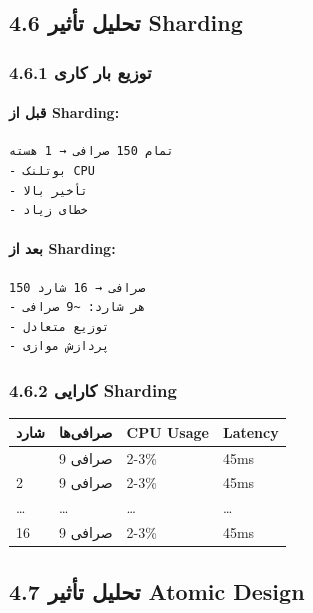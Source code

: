 \documentclass[
]{article}
\newcounter{none} %
\begin{document}
\subsection{4.6 تحلیل تأثیر
Sharding}\label{ux62aux62dux644ux6ccux644-ux62aux623ux62bux6ccux631-sharding}

\subsubsection{4.6.1 توزیع بار
کاری}\label{ux62aux648ux632ux6ccux639-ux628ux627ux631-ux6a9ux627ux631ux6cc}

\paragraph{قبل از Sharding:}\label{ux642ux628ux644-ux627ux632-sharding}

\begin{verbatim}
تمام 150 صرافی → 1 هسته
- بوتلنک CPU
- تأخیر بالا
- خطای زیاد
\end{verbatim}

\paragraph{بعد از Sharding:}\label{ux628ux639ux62f-ux627ux632-sharding}

\begin{verbatim}
150 صرافی → 16 شارد
- هر شارد: ~9 صرافی
- توزیع متعادل
- پردازش موازی
\end{verbatim}

\subsubsection{4.6.2 کارایی
Sharding}\label{ux6a9ux627ux631ux627ux6ccux6cc-sharding}

{\def\LTcaptype{none} %
\begin{longtable}[]{@{}llll@{}}
\toprule\noalign{}
شارد & صرافی‌ها & CPU Usage & Latency \\
\midrule\noalign{}
\endhead
\bottomrule\noalign{}
\endlastfoot
1 & 9 صرافی & 2-3\% & 45ms \\
2 & 9 صرافی & 2-3\% & 45ms \\
\ldots{} & \ldots{} & \ldots{} & \ldots{} \\
16 & 9 صرافی & 2-3\% & 45ms \\
\end{longtable}
}

\subsection{4.7 تحلیل تأثیر Atomic
Design}\label{ux62aux62dux644ux6ccux644-ux62aux623ux62bux6ccux631-atomic-design}
\end{document}
